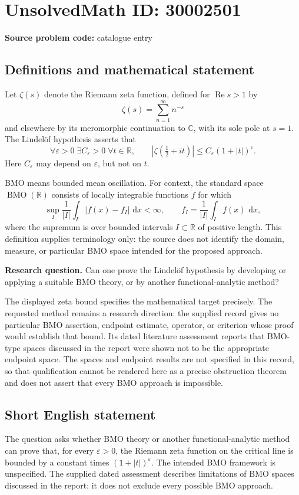\documentclass[11pt]{article}
\newcommand{\R}{\mathbb{R}}
\newcommand{\C}{\mathbb{C}}
\newcommand{\dd}{\,\mathrm{d}}
\begin{document}
\section*{UnsolvedMath ID: 30002501}
\textbf{Source problem code:} catalogue entry
\subsection{Definitions and mathematical statement}
Let \(\zeta(s)\) denote the Riemann zeta function, defined for \(\operatorname{Re}s>1\) by
\[
\zeta(s)=\sum_{n=1}^{\infty}n^{-s}
\]
and elsewhere by its meromorphic continuation to \(\C\), with its sole pole at \(s=1\). The Lindel\"of hypothesis asserts that
\[
\forall\varepsilon>0\;\exists C_{\varepsilon}>0\;\forall t\in\R,
\qquad
\left|\zeta\!\left(\tfrac12+it\right)\right|
\leq C_{\varepsilon}(1+|t|)^{\varepsilon}.
\]
Here \(C_{\varepsilon}\) may depend on \(\varepsilon\), but not on \(t\).

BMO means bounded mean oscillation. For context, the standard space \(\operatorname{BMO}(\R)\) consists of locally integrable functions \(f\) for which
\[
\sup_I\frac{1}{|I|}\int_I|f(x)-f_I|\,\dd x<\infty,
\qquad
f_I=\frac{1}{|I|}\int_I f(x)\,\dd x,
\]
where the supremum is over bounded intervals \(I\subset\R\) of positive length. This definition supplies terminology only: the source does not identify the domain, measure, or particular BMO space intended for the proposed approach.

\textbf{Research question.} Can one prove the Lindel\"of hypothesis by developing or applying a suitable BMO theory, or by another functional-analytic method?

The displayed zeta bound specifies the mathematical target precisely. The requested method remains a research direction: the supplied record gives no particular BMO assertion, endpoint estimate, operator, or criterion whose proof would establish that bound. Its dated literature assessment reports that BMO-type spaces discussed in the report were shown not to be the appropriate endpoint space. The spaces and endpoint results are not specified in this record, so that qualification cannot be rendered here as a precise obstruction theorem and does not assert that every BMO approach is impossible.
\subsection{Short English statement}
The question asks whether BMO theory or another functional-analytic method can prove that, for every \(\varepsilon>0\), the Riemann zeta function on the critical line is bounded by a constant times \((1+|t|)^{\varepsilon}\). The intended BMO framework is unspecified. The supplied dated assessment describes limitations of BMO spaces discussed in the report; it does not exclude every possible BMO approach.
\end{document}
